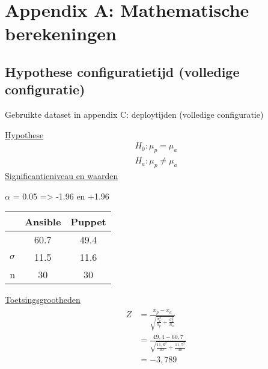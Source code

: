 
\chapter*{Appendix A: Mathematische berekeningen}
\label{ch:mathematiek}

\section*{Hypothese configuratietijd (volledige configuratie)}
\label{wis:hypothesedeploytijd}

Gebruikte dataset in appendix C: deploytijden (volledige configuratie)%

\underline{Hypothese}
\begin{align*}
H_0:  \mu_p = \mu_a \\
H_a: \mu_p\neq \mu_a 
\end{align*}
\underline{Significantieniveau en waarden}

$\alpha$ = 0.05 => -1.96 en +1.96 \newline

		\begin{tabular}{ r |c |c }
			& Ansible & Puppet\\\hline
			\unexpanded{$ \bar x  $} &  60.7 & 49.4\\ \hline
			$\sigma$ & 11.5 & 11.6\\ \hline
			n &  30 &  30

\end{tabular}


\underline{Toetsingsgrootheden}
\begin{equation} \label{eq1}
\begin{split}
Z &= \tfrac{\bar x_p - \bar x_a}{\sqrt{\tfrac{\sigma_p^2}{n_p}+\tfrac{\sigma_a^2}{n_a}}}\\
& = \tfrac{49,4 - 60,7}{\sqrt{\tfrac{11,6^2}{30}+\tfrac{11,5^2}{30}}} \\
& = -3,789
\end{split}
\end{equation}

